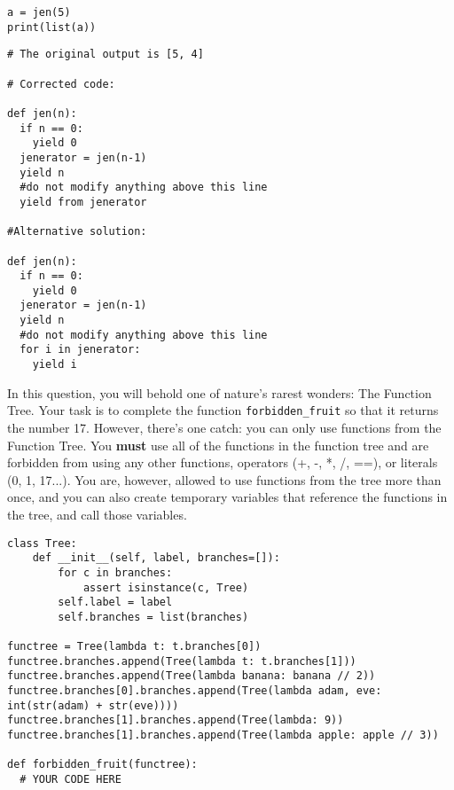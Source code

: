 \documentclass{exam}
\begin{document}
\begin{questions}
\begin{blocksection}
\begin{lstlisting}
a = jen(5)
print(list(a))
\end{lstlisting}

\begin{solution}
\begin{lstlisting}
# The original output is [5, 4]

# Corrected code: 

def jen(n):
  if n == 0:
    yield 0
  jenerator = jen(n-1)
  yield n
  #do not modify anything above this line
  yield from jenerator

#Alternative solution:

def jen(n):
  if n == 0:
    yield 0
  jenerator = jen(n-1)
  yield n
  #do not modify anything above this line
  for i in jenerator:
    yield i
\end{lstlisting}    
\end{solution}
\end{blocksection}

\pagebreak

\begin{blocksection}
\question In this question, you will behold one of nature's rarest wonders: The Function Tree. Your task is to complete the function \lstinline$forbidden_fruit$ so that it returns the number 17. However, there's one catch: you can only use functions from the Function Tree. You \textbf{must} use all of the functions in the function tree and are forbidden from using any other functions, operators (+, -, *, /, ==), or literals (0, 1, 17...). You are, however, allowed to use functions from the tree more than once, and you can also create temporary variables that reference the functions in the tree, and call those variables. 

\begin{lstlisting}
class Tree:
    def __init__(self, label, branches=[]):
        for c in branches:
            assert isinstance(c, Tree)
        self.label = label
        self.branches = list(branches)

functree = Tree(lambda t: t.branches[0])
functree.branches.append(Tree(lambda t: t.branches[1]))
functree.branches.append(Tree(lambda banana: banana // 2))
functree.branches[0].branches.append(Tree(lambda adam, eve: int(str(adam) + str(eve))))
functree.branches[1].branches.append(Tree(lambda: 9))
functree.branches[1].branches.append(Tree(lambda apple: apple // 3))

def forbidden_fruit(functree):
  # YOUR CODE HERE









\end{lstlisting}
\end{blocksection}
\end{questions}
\end{document}

